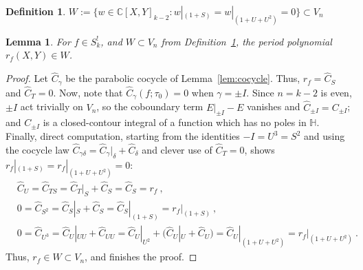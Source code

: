 \documentclass[11pt]{article}
\newtheorem{lemma}[theorem]{Lemma}
\newtheorem{definition}[theorem]{Definition}
\newcommand{\HH}{\mathbb{H}}
\newcommand{\CC}{\mathbb{C}}
\begin{document}
\begin{definition}\label{def:w}
$W:=\{w\in\CC[X,Y]_{k-2}: w|_{(1+S)}=w|_{(1+U+U^2)}=0\} \subset V_n$
\end{definition}

\begin{lemma}\label{lem:rfW}
For $f\in S_k^!$, and $W \subset V_n$ from Definition~\ref{def:w}, the period polynomial $r_f(X, Y) \in W$.
\end{lemma}
\begin{proof}
Let $\hat C_\gamma$ be the parabolic cocycle of Lemma~\ref{lem:cocycle}. Thus, $r_f=\hat C_S$ 
and $\hat C_T=0$. Now, note that $\hat C_\gamma(f; \tau_0) = 0$ when $\gamma = \pm I$. Since
$n=k-2$ is even, $\pm I$ act trivially on $V_n$, so the coboundary term $E|_{\pm I}-E$ vanishes and
$\hat C_{\pm I}=C_{\pm I}$; and $C_{\pm I}$ is a closed-contour integral of a function which has no
poles in $\HH$. Finally, direct computation, starting from the identities $-I = U^3 = S^2$
and using the cocycle law $\hat C_{\gamma\delta}=\hat C_\gamma|_\delta+\hat C_\delta$ and clever 
use of $\hat C_T = 0$, shows $r_f|_{(1+S)}=r_f|_{(1+U+U^2)}=0$:
\begin{align}
&\hat C_U = \hat C_{TS} = \hat C_T|_S + \hat C_S = \hat C_S = r_f~,  \\
&0 = \hat C_{S^2} = \hat C_S|_S + \hat C_S = \hat C_S|_{(1+S)} = r_f|_{(1+S)}~,\\
&0 = \hat C_{U^3} = \hat C_U|_{UU}+\hat C_{UU}=\hat C_U|_{U^2}+\big(\hat C_U|_U+\hat C_U\big)=\hat C_U|_{(1+U+U^2)}=r_f|_{(1+U+U^2)}~.
\end{align}
Thus, $r_f \in W \subset V_n$, and finishes the proof. %
\end{proof}
\end{document}
